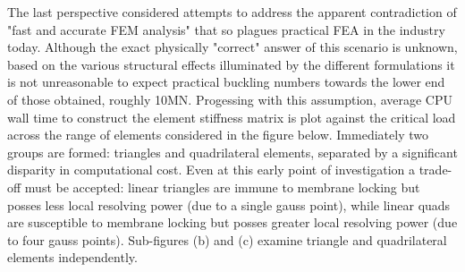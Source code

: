 The last perspective considered attempts to address the apparent contradiction of "fast and accurate FEM analysis" that so plagues practical FEA in the industry today. Although the exact physically "correct" answer of this scenario is unknown, based on the various structural effects illuminated by the different formulations it is not unreasonable to expect practical buckling numbers towards the lower end of those obtained, roughly 10MN. Progessing with this assumption, average CPU wall time to construct the element stiffness matrix is plot against the critical load across the range of elements considered in the figure below. Immediately two groups are formed: triangles and quadrilateral elements, separated by a significant disparity in computational cost. Even at this early point of investigation a trade-off must be accepted: linear triangles are immune to membrane locking but posses less local resolving power (due to a single gauss point), while linear quads are susceptible to membrane locking but posses greater local resolving power (due to four gauss points). Sub-figures (b) and (c) examine triangle and quadrilateral elements independently.

